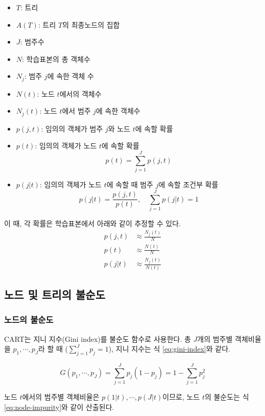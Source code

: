 \documentclass[]{book}
\providecommand{\tightlist}{%
  \setlength{\itemsep}{0pt}\setlength{\parskip}{0pt}}
\begin{document}
\begin{itemize}
\tightlist
\item
  \(T\): 트리
\item
  \(A(T)\): 트리 \(T\)의 최종노드의 집합
\item
  \(J\): 범주수
\item
  \(N\): 학습표본의 총 객체수
\item
  \(N_j\): 범주 \(j\)에 속한 객체 수
\item
  \(N(t)\): 노드 \(t\)에서의 객체수
\item
  \(N_j(t)\): 노드 \(t\)에서 범주 \(j\)에 속한 객체수
\item
  \(p(j,t)\): 임의의 객체가 범주 \(j\)와 노드 \(t\)에 속할 확률
\item
  \(p(t)\): 임의의 객체가 노드 \(t\)에 속할 확률
  \[p(t) = \sum_{j=1}^{J} p(j,t)\]
\item
  \(p(j|t)\): 임의의 객체가 노드 \(t\)에 속할 때 범주 \(j\)에 속할 조건부 확률
  \[p(j|t) = \frac{p(j,t)}{p(t)}, \quad \sum_{j=1}^{J} p(j|t) = 1\]
\end{itemize}

이 때, 각 확률은 학습표본에서 아래와 같이 추정할 수 있다.
\begin{align}
p(j,t) &\approx \frac{N_j(t)}{N}\\
p(t) &\approx \frac{N(t)}{N}\\
p(j|t) &\approx \frac{N_j(t)}{N(t)}
\end{align}

\hypertarget{cart-impurity}{%
\subsection{노드 및 트리의 불순도}\label{cart-impurity}}

\hypertarget{-}{%
\subsubsection{노드의 불순도}\label{-}}

CART는 지니 지수(Gini index)를 불순도 함수로 사용한다. 총 \(J\)개의 범주별 객체비율을 \(p_1, \cdots , p_J\)라 할 때 (\(\sum_{j=1}^{J} p_j = 1\)), 지니 지수는 식 \eqref{eq:gini-index}와 같다.

\begin{equation}
G(p_1, \cdots, p_J) = \sum_{j=1}^{J} p_j(1-p_j) = 1 - \sum_{j=1}^{J}p_j^2 \label{eq:gini-index}
\end{equation}

노드 \(t\)에서의 범주별 객체비율은 \(p(1|t), \cdots, p(J|t)\)이므로, 노드 \(t\)의 불순도는 식 \eqref{eq:node-impurity}와 같이 산출된다.
\end{document}
